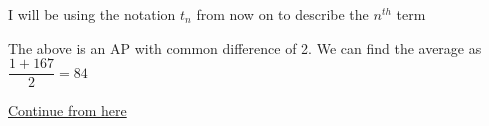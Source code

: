 \begin{NOTE}
    I will be using the notation $t_n$ from now on to describe the $n^{th}$ term
\end{NOTE}


The above is an AP with common difference of 2. We can find the average as $\dfrac{1 + 167}{2} = 84$

\href{https://youtu.be/q-ZUkah-xys?si=V63ya2Kswin-ulr-}{Continue from here}